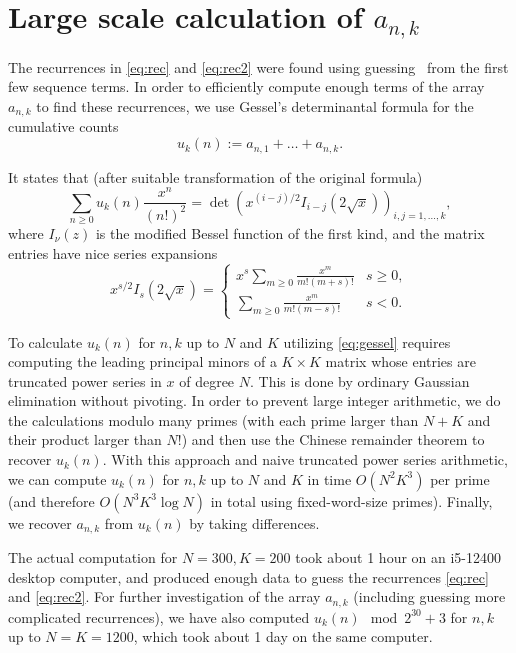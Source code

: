\documentclass[a4paper,draft]{amsart}
\begin{document}
\section{Large scale calculation of $a_{n,k}$}

The recurrences in \eqref{eq:rec} and \eqref{eq:rec2} were found using guessing~\cite{KauersGuess} from the
first few sequence terms. 
In order to efficiently compute enough terms of the array $a_{n,k}$ to find these recurrences, we use Gessel's
determinantal formula \cite[Section 7]{MR1041448} for the cumulative counts
\[
u_k(n):=a_{n,1}+\dots+a_{n,k}.
\]

It states that (after suitable transformation of the original formula)
\begin{equation}\label{eq:gessel}
\sum_{n\geq0}u_k(n)\frac{x^{n}}{(n!)^2}=\det\left(x^{(i-j)/2}I_{i-j}(2\sqrt{x})\right)_{i,j=1,\ldots,k},
\end{equation}
where $I_\nu(z)$ is the modified Bessel function of the first kind, and the matrix entries have nice series expansions
\[
x^{s/2}I_{s}(2\sqrt{x}) = \begin{cases}
    x^s\sum_{m\geq0} \frac{x^{m}}{m!(m+s)!} & s\geq 0,\\
    \sum_{m\geq0} \frac{x^{m}}{m!(m-s)!} & s<0.
\end{cases}
\]

To calculate $u_k(n)$ for $n,k$ up to $N$ and $K$ utilizing \eqref{eq:gessel} requires computing the leading principal minors of a $K\times K$ matrix whose entries are truncated power series in $x$ of degree $N$. This is done by ordinary Gaussian elimination without pivoting. In order to prevent large integer arithmetic, we do the calculations modulo many primes (with each prime larger than $N+K$ and their product larger than $N!$) and then use the Chinese remainder theorem to recover $u_k(n)$. With this approach and naive truncated power series arithmetic, we can compute $u_k(n)$ for $n,k$ up to $N$ and $K$ in time $O(N^2K^3)$ per prime (and therefore $O(N^3K^3\log N)$ in total using fixed-word-size primes). Finally, we recover $a_{n,k}$ from $u_k(n)$ by taking differences.

The actual computation for $N=300, K=200$ took about 1 hour on an i5-12400 desktop computer, and produced enough data to guess the recurrences \eqref{eq:rec} and \eqref{eq:rec2}. For further investigation of the array $a_{n,k}$ (including guessing more complicated recurrences), we have also computed $u_k(n) \mod 2^{30}+3$ for $n,k$ up to $N=K=1200$, which took about 1 day on the same computer.
\end{document}
